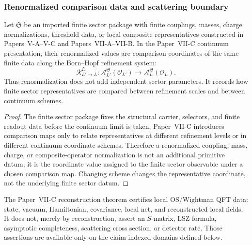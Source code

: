 \documentclass[12pt,a4paper]{article}
\begin{document}
\subsubsection{Renormalized comparison data and scattering boundary}
\label{p12:sec:renormalized-data-scattering-boundary}

\begin{proposition}
\label{p12:prop:renormalized-sector-data-comparison}
Let \(\mathfrak S\) be an imported finite sector package with finite couplings, masses, charge normalizations, threshold data, or local composite representatives constructed in Papers~V-A--V-C and Papers~VII-A--VII-B.  In the Paper~VII-C continuum presentation, their renormalized values are comparison coordinates of the same finite data along the Born--Hopf refinement system:
\[
\mathcal R_{L'\to L}^{\mathfrak S}:
\mathcal A_{L'}^{\mathfrak S}(\mathcal O_{L'})
\longrightarrow
\mathcal A_L^{\mathfrak S}(\mathcal O_L).
\]
Thus renormalization does not add independent sector parameters.  It records how finite sector representatives are compared between refinement scales and between continuum schemes.
\end{proposition}

\begin{proof}
The finite sector package fixes the structural carrier, selectors, and finite readout data before the continuum limit is taken.  Paper~VII-C introduces comparison maps only to relate representatives at different refinement levels or in different continuum coordinate schemes.  Therefore a renormalized coupling, mass, charge, or composite-operator normalization is not an additional primitive datum; it is the coordinate value assigned to the finite sector observable under a chosen comparison map.  Changing scheme changes the representative coordinate, not the underlying finite sector datum.
\end{proof}

\begin{proposition}
\label{p12:prop:scattering-nonclaim}
The Paper~VII-C reconstruction theorem certifies local OS/Wightman QFT data:
state, vacuum, Hamiltonian, covariance, local net, and reconstructed local
fields.  It does not, merely by reconstruction, assert an \(S\)-matrix, LSZ
formula, asymptotic completeness, scattering cross section, or detector rate.
Those assertions are available only on the claim-indexed domains defined below.
\end{proposition}
\end{document}
